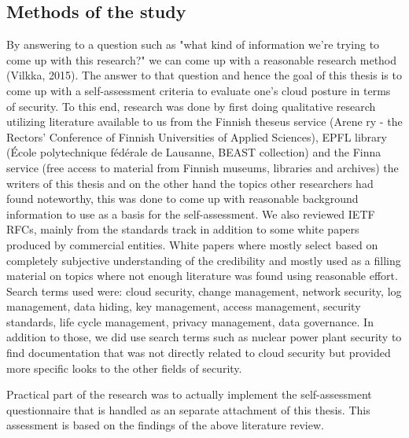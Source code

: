 \documentclass{article}
\begin{document}
\subsection{Methods of the study}
By answering to a question such as "what kind of information we're trying to come up with this research?" we can come up with a reasonable research method (Vilkka, 2015).
The answer to that question and hence the goal of this thesis is to come up with a self-assessment criteria to evaluate one's cloud posture in terms of security.
To this end, research was done by first doing qualitative research utilizing literature available to us from the Finnish theseus service (Arene ry - the Rectors' Conference of Finnish Universities of Applied Sciences), EPFL library (École polytechnique fédérale de Lausanne, BEAST collection) and the Finna service (free access to material from Finnish museums, libraries and archives) the writers of this thesis and on the other hand the topics other researchers had found noteworthy, this was done to come up with reasonable background information to use as a basis for the self-assessment. We also reviewed IETF RFCs, mainly from the standards track in addition to some white papers produced by commercial entities. White papers where mostly select based on completely subjective understanding of the credibility and mostly used as a filling material on topics where not enough literature was found using reasonable effort. Search terms used were: cloud security, change management, network security, log management, data hiding, key management, access management, security standards, life cycle management, privacy management, data governance. In addition to those, we did use search terms such as nuclear power plant security to find documentation that was not directly related to cloud security but provided more specific looks to the other fields of security.
\par
Practical part of the research was to actually implement the self-assessment questionnaire that is handled as an separate attachment of this thesis. This assessment is based on the findings of the above literature review.
\end{document}
